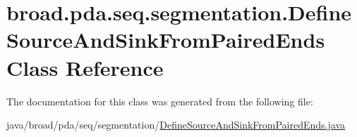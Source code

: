 \hypertarget{classbroad_1_1pda_1_1seq_1_1segmentation_1_1_define_source_and_sink_from_paired_ends}{\section{broad.\+pda.\+seq.\+segmentation.\+Define\+Source\+And\+Sink\+From\+Paired\+Ends Class Reference}
\label{classbroad_1_1pda_1_1seq_1_1segmentation_1_1_define_source_and_sink_from_paired_ends}
}


The documentation for this class was generated from the following file\+:\begin{DoxyCompactItemize}
\item 
java/broad/pda/seq/segmentation/\hyperlink{_define_source_and_sink_from_paired_ends_8java}{Define\+Source\+And\+Sink\+From\+Paired\+Ends.\+java}\end{DoxyCompactItemize}
